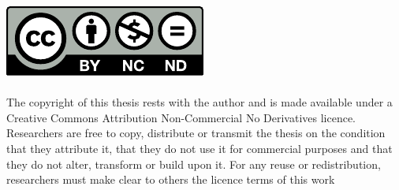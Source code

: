 \documentclass[oneside,12pt,online,a4paper,pdfa1,numbered,biblatex,fontC]{PhDthesisTUB}
\begin{document}

\frontmatter
{}
\maketitle

{}





\includegraphics{9_backmatter/doclicense-CC-by-nc-nd.pdf}\\
\doclicenseLongText\\

The copyright of this thesis rests with the author and is made available under a
Creative Commons Attribution Non-Commercial  No Derivatives licence. Researchers
are free to copy,  distribute or transmit the thesis on  the condition that they
attribute it, that they  do not use it for commercial purposes  and that they do
not  alter,  transform or  build  upon  it.  For  any reuse  or  redistribution,
researchers must make clear to others the licence terms of this work




\end{document}
